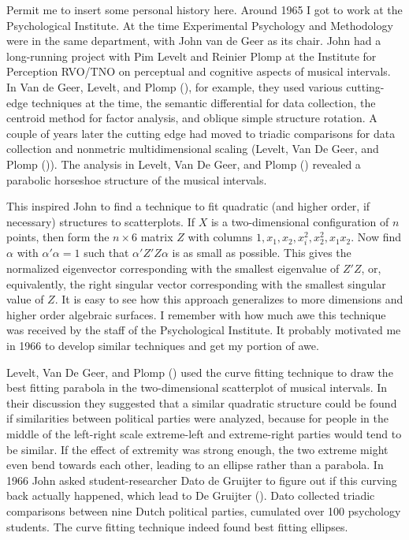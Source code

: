 \documentclass[
  12pt,
  letterpaper,
  DIV=11,
  numbers=noendperiod]{scrreprt}
\theoremstyle{remark}
\begin{document}
Permit me to insert some personal history here. Around 1965 I got to
work at the Psychological Institute. At the time Experimental Psychology
and Methodology were in the same department, with John van de Geer as
its chair. John had a long-running project with Pim Levelt and Reinier
Plomp at the Institute for Perception RVO/TNO on perceptual and
cognitive aspects of musical intervals. In Van de Geer, Levelt, and
Plomp (), for example,
they used various cutting-edge techniques at the time, the semantic
differential for data collection, the centroid method for factor
analysis, and oblique simple structure rotation. A couple of years later
the cutting edge had moved to triadic comparisons for data collection
and nonmetric multidimensional scaling (Levelt, Van De Geer, and Plomp
()). The analysis in
Levelt, Van De Geer, and Plomp
() revealed a parabolic
horseshoe structure of the musical intervals.

This inspired John to find a technique to fit quadratic (and higher
order, if necessary) structures to scatterplots. If \(X\) is a
two-dimensional configuration of \(n\) points, then form the
\(n\times 6\) matrix \(Z\) with columns
\(1,x_1,x_2,x_i^2,x_2^2,x_1x_2\). Now find \(\alpha\) with
\(\alpha'\alpha=1\) such that \(\alpha'Z'Z\alpha\) is as small as
possible. This gives the normalized eigenvector corresponding with the
smallest eigenvalue of \(Z'Z\), or, equivalently, the right singular
vector corresponding with the smallest singular value of \(Z\). It is
easy to see how this approach generalizes to more dimensions and higher
order algebraic surfaces. I remember with how much awe this technique
was received by the staff of the Psychological Institute. It probably
motivated me in 1966 to develop similar techniques and get my portion of
awe.

Levelt, Van De Geer, and Plomp
() used the curve fitting
technique to draw the best fitting parabola in the two-dimensional
scatterplot of musical intervals. In their discussion they suggested
that a similar quadratic structure could be found if similarities
between political parties were analyzed, because for people in the
middle of the left-right scale extreme-left and extreme-right parties
would tend to be similar. If the effect of extremity was strong enough,
the two extreme might even bend towards each other, leading to an
ellipse rather than a parabola. In 1966 John asked student-researcher
Dato de Gruijter to figure out if this curving back actually happened,
which lead to De Gruijter (). Dato
collected triadic comparisons between nine Dutch political parties,
cumulated over 100 psychology students. The curve fitting technique
indeed found best fitting ellipses.
\end{document}
